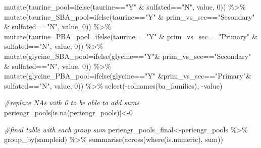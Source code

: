 \documentclass[
]{book}
\newenvironment{Shaded}{\begin{snugshade}}{\end{snugshade}}
\newcommand{\AttributeTok}[1]{\textcolor[rgb]{0.77,0.63,0.00}{#1}}
\newcommand{\CommentTok}[1]{\textcolor[rgb]{0.56,0.35,0.01}{\textit{#1}}}
\newcommand{\DecValTok}[1]{\textcolor[rgb]{0.00,0.00,0.81}{#1}}
\newcommand{\FunctionTok}[1]{\textcolor[rgb]{0.00,0.00,0.00}{#1}}
\newcommand{\NormalTok}[1]{#1}
\newcommand{\OtherTok}[1]{\textcolor[rgb]{0.56,0.35,0.01}{#1}}
\newcommand{\SpecialCharTok}[1]{\textcolor[rgb]{0.00,0.00,0.00}{#1}}
\newcommand{\StringTok}[1]{\textcolor[rgb]{0.31,0.60,0.02}{#1}}
\begin{document}
\begin{Shaded}
\begin{Highlighting}[]
  \FunctionTok{mutate}\NormalTok{(}\AttributeTok{taurine\_pool=}\FunctionTok{ifelse}\NormalTok{(taurine}\SpecialCharTok{==}\StringTok{"Y"} \SpecialCharTok{\&}\NormalTok{ sulfated}\SpecialCharTok{==}\StringTok{"N"}\NormalTok{, value, }\DecValTok{0}\NormalTok{)) }\SpecialCharTok{\%\textgreater{}\%} 
  \FunctionTok{mutate}\NormalTok{(}\AttributeTok{taurine\_SBA\_pool=}\FunctionTok{ifelse}\NormalTok{(taurine}\SpecialCharTok{==}\StringTok{"Y"} \SpecialCharTok{\&}\NormalTok{ prim\_vs\_sec}\SpecialCharTok{==}\StringTok{"Secondary"} \SpecialCharTok{\&}\NormalTok{ sulfated}\SpecialCharTok{==}\StringTok{"N"}\NormalTok{, value, }\DecValTok{0}\NormalTok{)) }\SpecialCharTok{\%\textgreater{}\%} 
  \FunctionTok{mutate}\NormalTok{(}\AttributeTok{taurine\_PBA\_pool=}\FunctionTok{ifelse}\NormalTok{(taurine}\SpecialCharTok{==}\StringTok{"Y"} \SpecialCharTok{\&}\NormalTok{ prim\_vs\_sec}\SpecialCharTok{==}\StringTok{"Primary"} \SpecialCharTok{\&}\NormalTok{ sulfated}\SpecialCharTok{==}\StringTok{"N"}\NormalTok{, value, }\DecValTok{0}\NormalTok{)) }\SpecialCharTok{\%\textgreater{}\%} 
  \FunctionTok{mutate}\NormalTok{(}\AttributeTok{glycine\_SBA\_pool=}\FunctionTok{ifelse}\NormalTok{(glycine}\SpecialCharTok{==}\StringTok{"Y"}\SpecialCharTok{\&}\NormalTok{ prim\_vs\_sec}\SpecialCharTok{==}\StringTok{"Secondary"} \SpecialCharTok{\&}\NormalTok{ sulfated}\SpecialCharTok{==}\StringTok{"N"}\NormalTok{, value, }\DecValTok{0}\NormalTok{)) }\SpecialCharTok{\%\textgreater{}\%} 
  \FunctionTok{mutate}\NormalTok{(}\AttributeTok{glycine\_PBA\_pool=}\FunctionTok{ifelse}\NormalTok{(glycine}\SpecialCharTok{==}\StringTok{"Y"} \SpecialCharTok{\&}\NormalTok{prim\_vs\_sec}\SpecialCharTok{==}\StringTok{"Primary"}\SpecialCharTok{\&}\NormalTok{ sulfated}\SpecialCharTok{==}\StringTok{"N"}\NormalTok{, value, }\DecValTok{0}\NormalTok{)) }\SpecialCharTok{\%\textgreater{}\%} 
  \FunctionTok{select}\NormalTok{(}\SpecialCharTok{{-}}\FunctionTok{colnames}\NormalTok{(ba\_families), }\SpecialCharTok{{-}}\NormalTok{value) }
  
\CommentTok{\#replace NAs with 0 to be able to add sums}
\NormalTok{periengr\_pools[}\FunctionTok{is.na}\NormalTok{(periengr\_pools)]}\OtherTok{\textless{}{-}}\DecValTok{0}

\CommentTok{\#final table with each group sum}
\NormalTok{periengr\_pools\_final}\OtherTok{\textless{}{-}}\NormalTok{periengr\_pools }\SpecialCharTok{\%\textgreater{}\%} 
  \FunctionTok{group\_by}\NormalTok{(sampleid) }\SpecialCharTok{\%\textgreater{}\%} 
  \FunctionTok{summarise}\NormalTok{(}\FunctionTok{across}\NormalTok{(}\FunctionTok{where}\NormalTok{(is.numeric), sum))}
\end{Highlighting}
\end{Shaded}
\end{document}

